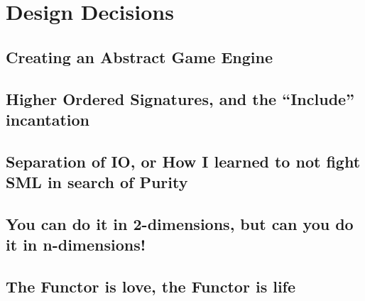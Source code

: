 \documentclass[9pt,letterpaper]{extarticle}
\begin{document}
	\section{Design Decisions}
  \subsection{Creating an Abstract Game Engine}
  \subsection{Higher Ordered Signatures, and the ``Include'' incantation}
  \subsection{Separation of IO, or How I learned to not fight SML in search of Purity}
  \subsection{You can do it in 2-dimensions, but can you do it in n-dimensions!}
  \subsection{The Functor is love, the Functor is life}
\end{document}
